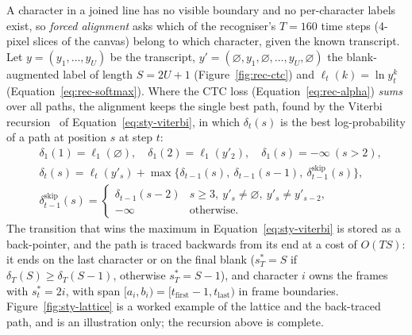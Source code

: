 A character in a joined line has no visible boundary and no per-character labels exist, so \emph{forced alignment} asks which of the recogniser's $T=160$ time steps (4-pixel slices of the canvas) belong to which character, given the known transcript.
Let $y=(y_1,\ldots,y_U)$ be the transcript, $y'=(\varnothing,y_1,\varnothing,\ldots,y_U,\varnothing)$ the blank-augmented label of length $S=2U+1$ (Figure~\ref{fig:rec-ctc}) and $\ell_t(k)=\ln y_t^k$ (Equation~\ref{eq:rec-softmax}).
Where the CTC loss (Equation~\ref{eq:rec-alpha}) \emph{sums} over all paths, the alignment keeps the single best path, found by the Viterbi recursion~\cite{viterbi1967} of Equation~\ref{eq:sty-viterbi}, in which $\delta_t(s)$ is the best log-probability of a path at position $s$ at step $t$:
\begin{equation}
\begin{split}
&\delta_1(1)=\ell_1(\varnothing),\quad\delta_1(2)=\ell_1(y'_2),\quad\delta_1(s)=-\infty\ (s>2),\\
&\delta_t(s)=\ell_t(y'_s)+\max\bigl\{\delta_{t-1}(s),\ \delta_{t-1}(s-1),\ \delta^{\mathrm{skip}}_{t-1}(s)\bigr\},\\
&\delta^{\mathrm{skip}}_{t-1}(s)=\begin{cases}\delta_{t-1}(s-2)&s\ge3,\ y'_s\ne\varnothing,\ y'_s\ne y'_{s-2},\\-\infty&\text{otherwise.}\end{cases}
\end{split}
\label{eq:sty-viterbi}
\end{equation}
The transition that wins the maximum in Equation~\ref{eq:sty-viterbi} is stored as a back-pointer, and the path is traced backwards from its end at a cost of $O(TS)$: it ends on the last character or on the final blank ($s^*_T=S$ if $\delta_T(S)\ge\delta_T(S-1)$, otherwise $s^*_T=S-1$), and character $i$ owns the frames with $s^*_t=2i$, with span $[a_i,b_i)=[t_{\mathrm{first}}-1,t_{\mathrm{last}})$ in frame boundaries.
Figure~\ref{fig:sty-lattice} is a worked example of the lattice and the back-traced path, and is an illustration only; the recursion above is complete.

